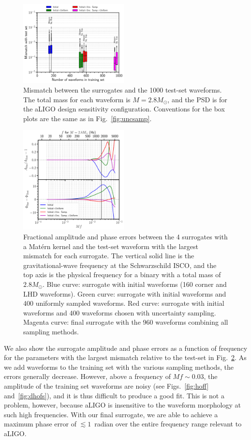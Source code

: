 \documentclass[prd,aps,letter,twocolumn,floatfix,notitlepage,nofootinbib]{revtex4-1}
\begin{document}
\begin{figure}[htb]
\centering
\includegraphics[width=0.49\textwidth]{mismatch.pdf}
\caption{
Mismatch between the surrogates and the 1000 test-set waveforms. The total mass for each waveform is $M=2.8M_\odot$, and the PSD is for the aLIGO design sensitivity configuration. Conventions for the box plots are the same as in Fig.~\ref{fig:uncsamp}.
}
\label{fig:mismatch}
\end{figure}

\begin{figure}[htb]
\centering
\includegraphics[width=0.49\textwidth]{htildemaxerror.pdf}
\caption{Fractional amplitude and phase errors between the 4 surrogates with a Mat\'{e}rn kernel and the test-set waveform with the largest mismatch for each surrogate. The vertical solid line is the gravitational-wave frequency at the Schwarzschild ISCO, and the top axis is the physical frequency for a binary with a total mass of $2.8M_\odot$. Blue curve: surrogate with initial waveforms (160 corner and LHD waveforms). Green curve: surrogate with initial waveforms and 400 uniformly sampled waveforms. Red curve: surrogate with initial waveforms and 400 waveforms chosen with uncertainty sampling. Magenta curve: final surrogate with the 960 waveforms combining all sampling methods.}
\label{fig:maxmismatchfd}
\end{figure}

We also show the surrogate amplitude and phase errors as a function of frequency for the parameters with the largest mismatch relative to the test-set in Fig.~\ref{fig:maxmismatchfd}. As we add waveforms to the training set with the various sampling methods, the errors generally decrease. However, above a frequency of $Mf \sim 0.03$, the amplitude of the training set waveforms are noisy (see Figs.~\ref{fig:hoff} and~\ref{fig:dhofs}), and it is thus difficult to produce a good fit. This is not a problem, however, because aLIGO is insensitive to the waveform morphology at such high frequencies. With our final surrogate, we are able to achieve a maximum phase error of $\lesssim 1$~radian over the entire frequency range relevant to aLIGO.
\end{document}
